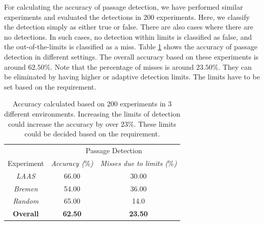For calculating the accuracy of passage detection, we have performed similar experiments and evaluated the detections in 200 experiments. Here, we classify the detection simply as either true or false. There are also cases where there are no detections. In such cases, no detection within limits is classified as false, and the out-of-the-limits is classified as a miss. Table \ref{acc_pass} shows the accuracy of passage detection in different settings. The overall accuracy based on these experiments is around $62.50\%$. Note that the percentage of misses is around $23.50\%$. They can be eliminated by having higher or adaptive detection limits. The limits have to be set based on the requirement.
\begin{table}[h!]
    \centering
    \begin{tabular}{|c|c|c|}
    \hline
    & \multicolumn{2}{c|}{Passage Detection}\\
    \cline{2-3}
    Experiment & \textit{Accuracy ($\%$)}& \textit{Misses due to limits ($\%$)} \\
    \hline
    \textit{LAAS} & 66.00 & 30.00 \\
    \hline
    \textit{Bremen} & 54.00 & 36.00 \\
    \hline
    \textit{Random} & 65.00 & 14.0 \\
    \hline
     \textbf{Overall} & \textbf{62.50} & \textbf{23.50} \\
    \hline
    \end{tabular}
    \caption{Accuracy calculated based on 200 experiments in 3 different environments. Increasing the limits of detection could increase the accuracy by over $23\%$. These limits could be decided based on the requirement.}
    \label{acc_pass}
\end{table}

